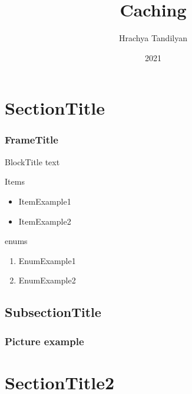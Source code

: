 \documentclass{beamer}
\begin{document}
\title[Caching]{Caching}
\author[Hrachya Tandilyan\copyright]{Hrachya Tandilyan}
\date{2021}

\begin{frame}
\titlepage
\end{frame}

\section{SectionTitle}
\begin{frame}\frametitle{FrameTitle}
\begin{block}{BlockTitle}
    text
\end{block}
\vfill
Items
\begin{itemize}
    \item ItemExample1
    \item ItemExample2
\end{itemize}
\vfill
enums
\begin{enumerate}
    \item EnumExample1
    \item EnumExample2
\end{enumerate}
\end{frame}

\subsection{SubsectionTitle}
\begin{frame}\frametitle{Picture example}
\end{frame}

\section{SectionTitle2}
\end{document}
